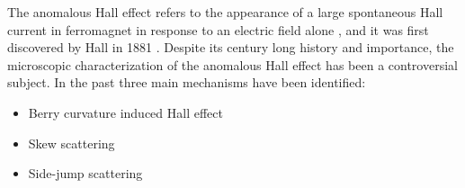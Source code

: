 The anomalous Hall effect refers to the appearance of a large spontaneous Hall current in ferromagnet in response to an electric field alone \cite{vanderbilt2018berry}, and it was first discovered by Hall in 1881 \cite{hall1881}. Despite its century long history and importance, the microscopic characterization of the anomalous Hall effect has been a controversial subject. In the past three main mechanisms have been identified:
\begin{itemize}
    \item Berry curvature induced Hall effect \cite{karplus1954hall}
    \item Skew scattering \cite{smith1958resonant}
    \item Side-jump scattering \cite{berger1970side}
\end{itemize}

